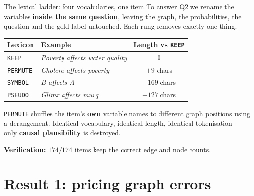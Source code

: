 \documentclass{beamer}
\begin{document}
\begin{frame}{The lexical ladder: four vocabularies, one item}
  To answer Q2 we rename the variables \textbf{inside the same question},
  leaving the graph, the probabilities, the question and the gold label
  untouched. Each rung removes exactly one thing.

  \begin{center}
  \begin{tabular}{llc}
    \toprule
    Lexicon & Example & Length vs \texttt{KEEP} \\
    \midrule
    \texttt{KEEP}    & \emph{Poverty affects water quality} & $0$ \\
    \texttt{PERMUTE} & \emph{Cholera affects poverty}       & $+9$ chars \\
    \texttt{SYMBOL}  & \emph{B affects A}                   & $-169$ chars \\
    \texttt{PSEUDO}  & \emph{Glimx affects muvq}            & $-127$ chars \\
    \bottomrule
  \end{tabular}
  \end{center}

  \vspace{0.3cm}
  \texttt{PERMUTE} shuffles the item's \textbf{own} variable names to different
  graph positions using a derangement. Identical vocabulary, identical length,
  identical tokenisation -- only \textbf{causal plausibility} is destroyed.

  \vspace{0.2cm}
  \textbf{Verification:} $174/174$ items keep the correct edge and node counts.
\end{frame}

\section{Result 1: pricing graph errors}
\begin{frame}
  \sectionpage
\end{frame}
\end{document}
